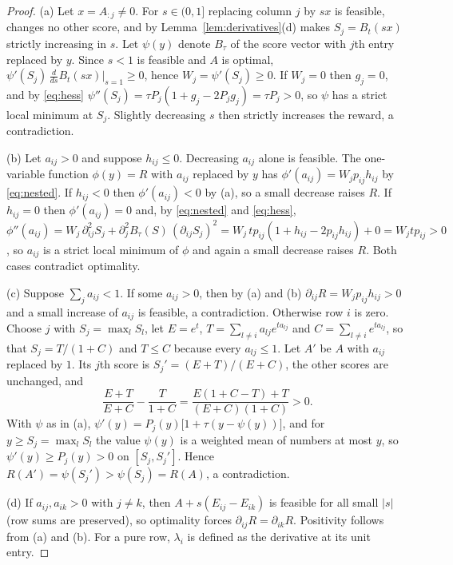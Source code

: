\documentclass[11pt]{article}
\theoremstyle{plain}
\theoremstyle{definition}
\theoremstyle{remark}
\begin{document}
\begin{proof}
(a) Let $x=A_{:j}\ne0$. For $s\in(0,1]$ replacing column $j$ by $sx$ is feasible, changes no other score, and by Lemma~\ref{lem:derivatives}(d) makes $S_j=B_t(sx)$ strictly increasing in $s$. Let $\psi(y)$ denote $B_\tau$ of the score vector with $j$th entry replaced by $y$. Since $s<1$ is feasible and $A$ is optimal, $\psi'(S_j)\,\frac{d}{ds}B_t(sx)\big|_{s=1}\ge0$, hence $W_j=\psi'(S_j)\ge0$. If $W_j=0$ then $g_j=0$, and by \eqref{eq:hess} $\psi''(S_j)=\tau P_j(1+g_j-2P_jg_j)=\tau P_j>0$, so $\psi$ has a strict local minimum at $S_j$. Slightly decreasing $s$ then strictly increases the reward, a contradiction.

(b) Let $a_{ij}>0$ and suppose $h_{ij}\le0$. Decreasing $a_{ij}$ alone is feasible. The one-variable function $\phi(y)=R$ with $a_{ij}$ replaced by $y$ has $\phi'(a_{ij})=W_jp_{ij}h_{ij}$ by \eqref{eq:nested}. If $h_{ij}<0$ then $\phi'(a_{ij})<0$ by (a), so a small decrease raises $R$. If $h_{ij}=0$ then $\phi'(a_{ij})=0$ and, by \eqref{eq:nested} and \eqref{eq:hess}, $\phi''(a_{ij})=W_j\,\partial_{ij}^2S_j+\partial_j^2B_\tau(S)\,(\partial_{ij}S_j)^2=W_j\,tp_{ij}(1+h_{ij}-2p_{ij}h_{ij})+0=W_jtp_{ij}>0$, so $a_{ij}$ is a strict local minimum of $\phi$ and again a small decrease raises $R$. Both cases contradict optimality.

(c) Suppose $\sum_ja_{ij}<1$. If some $a_{ij}>0$, then by (a) and (b) $\partial_{ij}R=W_jp_{ij}h_{ij}>0$ and a small increase of $a_{ij}$ is feasible, a contradiction. Otherwise row $i$ is zero. Choose $j$ with $S_j=\max_lS_l$, let $E=e^t$, $T=\sum_{l\ne i}a_{lj}e^{ta_{lj}}$ and $C=\sum_{l\ne i}e^{ta_{lj}}$, so that $S_j=T/(1+C)$ and $T\le C$ because every $a_{lj}\le1$. Let $A'$ be $A$ with $a_{ij}$ replaced by $1$. Its $j$th score is $S_j'=(E+T)/(E+C)$, the other scores are unchanged, and
\[
 \frac{E+T}{E+C}-\frac{T}{1+C}=\frac{E(1+C-T)+T}{(E+C)(1+C)}>0 .
\]
With $\psi$ as in (a), $\psi'(y)=P_j(y)\bigl[1+\tau(y-\psi(y))\bigr]$, and for $y\ge S_j=\max_lS_l$ the value $\psi(y)$ is a weighted mean of numbers at most $y$, so $\psi'(y)\ge P_j(y)>0$ on $[S_j,S_j']$. Hence $R(A')=\psi(S_j')>\psi(S_j)=R(A)$, a contradiction.

(d) If $a_{ij},a_{ik}>0$ with $j\ne k$, then $A+s(E_{ij}-E_{ik})$ is feasible for all small $|s|$ (row sums are preserved), so optimality forces $\partial_{ij}R=\partial_{ik}R$. Positivity follows from (a) and (b). For a pure row, $\lambda_i$ is defined as the derivative at its unit entry.
\end{proof}
\end{document}
